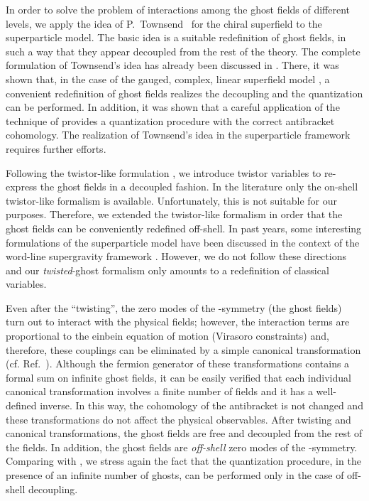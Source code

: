 \documentclass[a4paper,12pt]{article}
\begin{document}
In order to solve the problem of interactions among the ghost fields
of different levels, we apply the idea of P.~Townsend~\cite{3lectures}
for the chiral superfield to the superparticle model.  The basic idea
is a suitable redefinition of ghost fields, in such a way that they
appear decoupled from the rest of the theory. The complete formulation
of Townsend's idea has already been discussed in \cite{poli_1}. There,
it was shown that, in the case of the gauged, complex, linear
superfield model \cite{GPZ}, a convenient redefinition of ghost fields
realizes the decoupling and the quantization can be performed. In
addition, it was shown that a careful application of the technique of
\cite{GPZ} provides a quantization procedure with the correct
antibracket cohomology. The realization of Townsend's idea in the
superparticle framework requires further efforts.

Following the twistor-like formulation \cite{twistor-like}, we
introduce twistor variables to re-express the ghost fields in a
decoupled fashion. In the literature only the on-shell twistor-like
formalism is available.  Unfortunately, this is not suitable for our
purposes. Therefore, we extended the twistor-like formalism in order
that the ghost fields can be conveniently redefined off-shell.  In
past years, some interesting formulations of the superparticle model
have been discussed in the context of the \coordHE{} word-line supergravity
framework \cite{twistor-like}. However, we do not follow these
directions and our {\it twisted}-ghost formalism only amounts to a
redefinition of classical variables.

Even after the ``twisting'', the zero modes of the \myHighlight{$\kappa$}\coordHE{}-symmetry
(the ghost fields) turn out to interact with the physical fields;
however, the interaction terms are proportional to the einbein
equation of motion (Virasoro constraints) and, therefore, these
couplings can be eliminated by a simple canonical transformation (cf.
Ref.~\cite{cano}). Although the fermion generator of these
transformations contains a formal sum on infinite ghost fields, it can
be easily verified that each individual canonical transformation
involves a finite number of fields \cite{kallosh,Bastianelli} and it
has a well-defined inverse. In this way, the cohomology of the
antibracket is not changed and these transformations do not affect the
physical observables.
%
After twisting and canonical transformations, the ghost 
fields are free and decoupled from the rest of the fields. In
addition, the ghost fields are {\it off-shell} zero modes of the
\myHighlight{$\kappa$}\coordHE{}-symmetry. Comparing with \cite{poli_1,GPZ}, we stress again
the fact that the quantization procedure, in the presence of an
infinite number of ghosts, can be performed only in the case
of off-shell decoupling.
\end{document}
